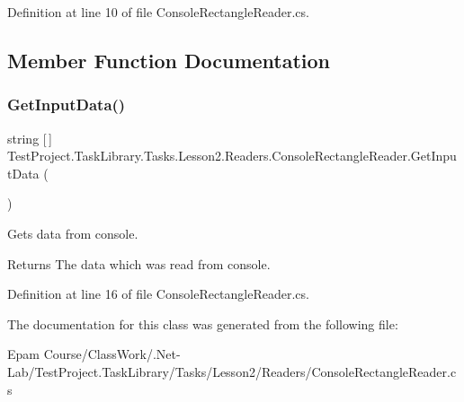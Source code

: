 Definition at line 10 of file Console\+Rectangle\+Reader.\+cs.



\subsection{Member Function Documentation}
\mbox{\label{class_test_project_1_1_task_library_1_1_tasks_1_1_lesson2_1_1_readers_1_1_console_rectangle_reader_acb84c685cd0a7919589846ee002885af}} 
\subsubsection{\texorpdfstring{GetInputData()}{GetInputData()}}
{\footnotesize\ttfamily string \mbox{[}$\,$\mbox{]} Test\+Project.\+Task\+Library.\+Tasks.\+Lesson2.\+Readers.\+Console\+Rectangle\+Reader.\+Get\+Input\+Data (\begin{DoxyParamCaption}{ }\end{DoxyParamCaption})}



Gets data from console. 

\begin{DoxyReturn}{Returns}
The data which was read from console.
\end{DoxyReturn}


Definition at line 16 of file Console\+Rectangle\+Reader.\+cs.



The documentation for this class was generated from the following file\+:\begin{DoxyCompactItemize}
\item 
Epam Course/\+Class\+Work/.\+Net-\/\+Lab/\+Test\+Project.\+Task\+Library/\+Tasks/\+Lesson2/\+Readers/Console\+Rectangle\+Reader.\+cs\end{DoxyCompactItemize}

